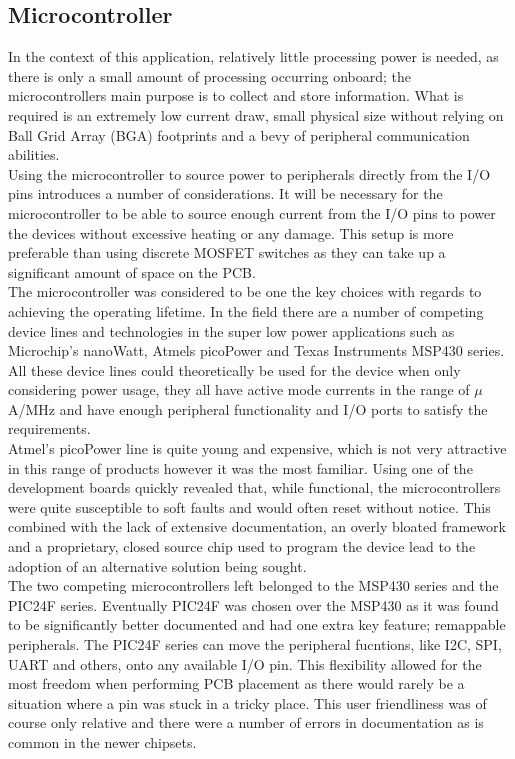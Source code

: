 \documentclass[12pt,openany,a4paper]{book}
\begin{document}
		
		\subsection{Microcontroller}
		In the context of this application, relatively little processing power is needed, as there is only a small amount of processing occurring onboard; the microcontrollers main purpose is to collect and store information. What is required is an extremely low current draw, small physical size without relying on Ball Grid Array (BGA) footprints and a bevy of peripheral communication abilities. \\
		
		Using the microcontroller to source power to peripherals directly from the I/O pins introduces a number of considerations. It will be necessary for the microcontroller to be able to source enough current from the I/O pins to power the devices without excessive heating or any damage. This setup is more preferable than using discrete MOSFET switches as they can take up a significant amount of space on the PCB. \\
				
		The microcontroller was considered to be one the key choices with regards to achieving the operating lifetime. In the field there are a number of competing device lines and technologies in the super low power applications such as Microchip's nanoWatt, Atmels picoPower and Texas Instruments MSP430 series. \\
		
		All these device lines could theoretically be used for the device when only considering power usage, they all have active mode currents in the range of $\mu$A/MHz and have enough peripheral functionality and I/O ports to satisfy the requirements. \\
		
		Atmel's picoPower line is quite young and expensive, which is not very attractive in this range of products however it was the most familiar. Using one of the development boards quickly revealed that, while functional, the microcontrollers were quite susceptible to soft faults and would often reset without notice. This combined with the lack of extensive documentation, an overly bloated framework and a proprietary, closed source chip used to program the device lead to the adoption of an alternative solution being sought. \\
		
		The two competing microcontrollers left belonged to the MSP430 series and the PIC24F series. Eventually PIC24F was chosen over the MSP430 as it was found to be significantly better documented and had one extra key feature; remappable peripherals. The PIC24F series can move the peripheral fucntions, like I2C, SPI, UART and others, onto any available I/O pin. This flexibility allowed for the most freedom when performing PCB placement as there would rarely be a situation where a pin was stuck in a tricky place. This user friendliness was of course only relative and there were a number of errors in documentation as is common in the newer chipsets. \\
		
\end{document}
